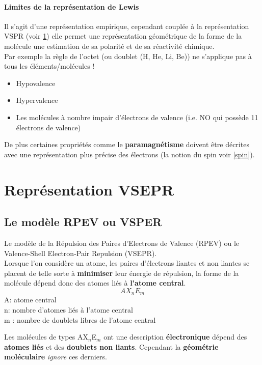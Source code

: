 \documentclass[10pt,a4paper]{book}
\begin{document}
\paragraph{Limites de la représentation de Lewis} Il s'agit d'une représentation empirique, cependant couplée à la représentation VSPR (voir \ref{VSPR}) elle permet une représentation géométrique de la forme de la molécule une estimation de sa polarité et de sa réactivité chimique. \\
Par exemple la règle de l’octet (ou doublet (H, He, Li, Be)) ne s’applique pas à tous les éléments/molécules !
\begin{itemize}
\item Hypovalence
\item Hypervalence
\item Les molécules à nombre impair d'électrons de valence (i.e. NO qui possède 11 électrons de valence)
\end{itemize}
De plus certaines propriétés comme le \textbf{paramagnétisme} doivent être décrites avec une représentation plus précise des électrons (la notion du spin voir \ref{spin}).

\section{Représentation VSEPR} \label{VSPR}

\subsection{Le modèle RPEV ou VSPER}

Le modèle de la Répulsion des Paires d’Electrons de Valence (RPEV) ou le Valence-Shell Electron-Pair Repulsion (VSEPR). \\
Lorsque l'on considère un atome, les paires d’électrons liantes et non liantes se placent de telle sorte à \textbf{minimiser} leur énergie de répulsion, la forme de la molécule dépend donc des atomes liés à \textbf{l'atome central}.
\begin{displaymath}
AX_nE_m
\end{displaymath}
A: atome central \\
n: nombre d’atomes liés à l’atome central \\
m : nombre de doublets libres de l’atome central \par
Les molécules de types AX$_n$E$_m$ ont une description \textbf{électronique} dépend des \textbf{atomes liés} et des \textbf{doublets non liants}. Cependant la \textbf{géométrie moléculaire} \textit{ignore} ces derniers.
\end{document}
